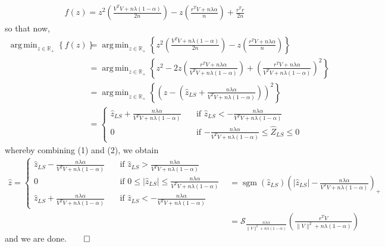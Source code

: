 \documentclass[10pt]{article}
\newcommand{\bp}[1]{\left({#1}\right)}
\newcommand{\mbb}[1]{\mathbb{#1}}
\newcommand{\1}[1]{\mathbbm{1}_{#1}}
\newcommand{\mc}[1]{\mathcal{#1}}
\DeclareMathOperator{\argmin}{arg\,min}
\DeclareMathOperator{\sgm}{sgm}
\begin{document}
    \begin{align*}
        f(z)=z^2\bp{\frac{V^TV+n\lambda(1-\alpha)}{2n}}-z\bp{\frac{r^TV+n\lambda\alpha}{n}}+\frac{r^Tr}{2n}
    \end{align*}
    so that now,
    \begin{align*}
        \argmin_{z\in\mbb{R}_+}\left\{f(z)\right\}&=\argmin_{z\in\mbb{R}_+}\left\{z^2\bp{\frac{V^TV+n\lambda(1-\alpha)}{2n}}-z\bp{\frac{r^TV+n\lambda\alpha}{n}}\right\}\\
        &=\argmin_{z\in\mbb{R}_+}\left\{z^2-2z\bp{\frac{r^TV+n\lambda\alpha}{V^TV+n\lambda(1-\alpha)}}+\bp{\frac{r^TV+n\lambda\alpha}{V^TV+n\lambda(1-\alpha)}}^2\right\}\\
        &=\argmin_{z\in\mbb{R}_+}\left\{\bp{z-\bp{\hat{z}_{LS}+\frac{n\lambda\alpha}{V^TV+n\lambda(1-\alpha)}}}^2\right\}\\
        &=\begin{cases}
            \hat{z}_{LS}+\frac{n\lambda\alpha}{V^TV+n\lambda(1-\alpha)}\quad&\text{if $\hat{z}_{LS}<-\tfrac{n\lambda\alpha}{V^TV+n\lambda(1-\alpha)}$}\\
            0\quad&\text{if $-\frac{n\lambda\alpha}{V^TV+n\lambda(1-\alpha)}\leq\hat{Z}_{LS}\leq 0$}
        \end{cases}\tag{2}
    \end{align*}
    whereby combining (1) and (2), we obtain
    \begin{align*}
        \hat{z}=\begin{cases}
            \hat{z}_{LS}-\frac{n\lambda\alpha}{V^TV+n\lambda(1-\alpha)}\quad & \text{if $\hat{z}_{LS}>\frac{n\lambda\alpha}{V^TV+n\lambda(1-\alpha)}$}\\
            0\quad & \text{if $0\leq |\hat{z}_{LS}|\leq\frac{n\lambda\alpha}{V^TV+n\lambda(1-\alpha)}$}\\
            \hat{z}_{LS}+\frac{n\lambda\alpha}{V^TV+n\lambda(1-\alpha)}\quad &\text{if $\hat{z}_{LS}<-\tfrac{n\lambda\alpha}{V^TV+n\lambda(1-\alpha)}$}
        \end{cases}&=\sgm(\hat{z}_{LS})\bp{|\hat{z}_{LS}|-\frac{n\lambda\alpha}{V^TV+n\lambda(1-\alpha)}}_+\\
        &=\mc{S}_{\frac{n\lambda\alpha}{\|V\|^2+n\lambda(1-\alpha)}}\bp{\frac{r^TV}{\|V\|^2+n\lambda(1-\alpha)}}
    \end{align*}
    and we are done.\hfill{$\qed$}\\[5pt]
\end{document}
